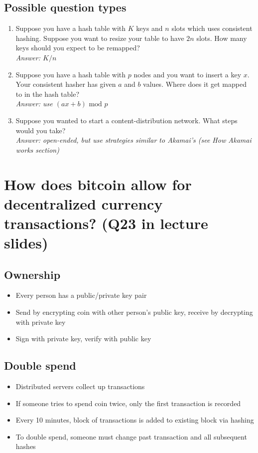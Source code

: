 \documentclass{article}
\begin{document}
\subsection{Possible question types}

\begin{enumerate}
\item Suppose you have a hash table with $K$ keys and $n$ slots which uses consistent hashing. Suppose you want to resize your table to have $2n$ slots. How many keys should you expect to be remapped? \\
\textit{Answer: $K/n$}
\item Suppose you have a hash table with $p$ nodes and you want to insert a key $x$. Your consistent hasher has given $a$ and $b$ values. Where does it get mapped to in the hash table? \\
\textit{Answer: use $(ax + b) \text{ mod } p$}
\item Suppose you wanted to start a content-distribution network. What steps would you take? \\
\textit{Answer: open-ended, but use strategies similar to Akamai's (see How Akamai works section)}
\end{enumerate}

\section{How does bitcoin allow for decentralized currency transactions? (Q23 in lecture slides)}

\subsection{Ownership}

\begin{itemize}
\item Every person has a public/private key pair
\item Send by encrypting coin with other person's public key, receive by decrypting with private key
\item Sign with private key, verify with public key
\end{itemize}

\subsection{Double spend}

\begin{itemize}
\item Distributed servers collect up transactions
\item If someone tries to spend coin twice, only the first transaction is recorded
\item Every 10 minutes, block of transactions is added to existing block via hashing
\item To double spend, someone must change past transaction and all subsequent hashes
\end{itemize}
\end{document}
